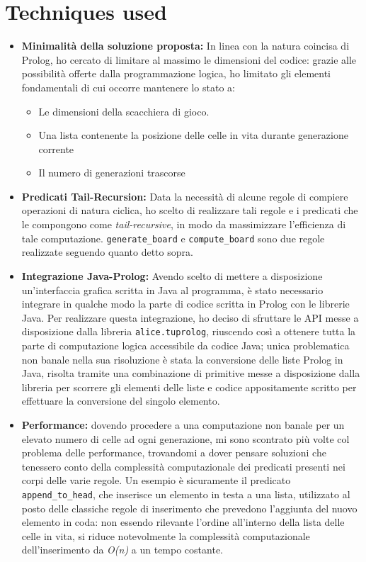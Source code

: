 \documentclass[10pt,italian]{article}
\begin{document}
\section{Techniques used}
\begin{itemize}
	\item \textbf{Minimalità della soluzione proposta:} In linea con la natura coincisa di Prolog, ho cercato di limitare al massimo le dimensioni del codice: grazie alle possibilità offerte dalla programmazione logica, ho limitato gli elementi fondamentali di cui occorre mantenere lo stato a:
	\begin{itemize}
		\item Le dimensioni della scacchiera di gioco.
		\item Una lista contenente la posizione delle celle in vita durante generazione corrente
		\item Il numero di generazioni trascorse
	\end{itemize}
	\item \textbf{Predicati Tail-Recursion:} Data la necessità di alcune regole di compiere operazioni di natura ciclica, ho scelto di realizzare tali regole e i predicati che le compongono come \textit{tail-recursive}, in modo da massimizzare l'efficienza di tale computazione. \texttt{generate\_board} e \texttt{compute\_board} sono due regole realizzate seguendo quanto detto sopra.
	\item \textbf{Integrazione Java-Prolog:} Avendo scelto di mettere a disposizione un'interfaccia grafica scritta in Java al programma, è stato necessario integrare in qualche modo la parte di codice scritta in Prolog con le librerie Java. Per realizzare questa integrazione, ho deciso di sfruttare le API messe a disposizione dalla libreria \texttt{alice.tuprolog}, riuscendo così a ottenere tutta la parte di computazione logica accessibile da codice Java; unica problematica non banale nella sua risoluzione è stata la conversione delle liste Prolog in Java, risolta tramite una combinazione di primitive messe a disposizione dalla libreria per scorrere gli elementi delle liste e codice appositamente scritto per effettuare la conversione del singolo elemento.
	\item \textbf{Performance:} dovendo procedere a una computazione non banale per un elevato numero di celle ad ogni generazione, mi sono scontrato più volte col problema delle performance, trovandomi a dover pensare soluzioni che tenessero conto della complessità computazionale dei predicati presenti nei corpi delle varie regole. Un esempio è sicuramente il predicato \texttt{append\_to\_head}, che inserisce un elemento in testa a una lista, utilizzato al posto delle classiche regole di inserimento che prevedono l'aggiunta del nuovo elemento in coda: non essendo rilevante l'ordine all'interno della lista delle celle in vita, si riduce notevolmente la complessità computazionale dell'inserimento da \textit{O(n)} a un tempo costante.\\
\end{itemize}
\end{document}
